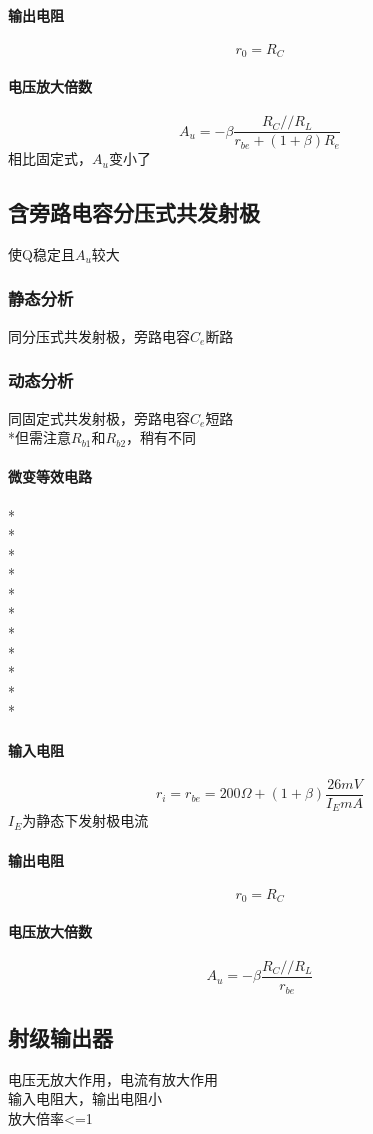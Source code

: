 \documentclass[UTF8, fontset=none]{ctexart}
\begin{document}
\begin{multicols*}{8}
\paragraph{输出电阻}
\[r_0 = R_{C}\]
\paragraph{电压放大倍数}
\[A_u = -\beta \frac{R_C//R_L}{r_{be} + (1 + \beta)R_e}\]
相比固定式，$A_u$变小了
\subsection{含旁路电容分压式共发射极}
使Q稳定且$A_u$较大
\subsubsection{静态分析}
同分压式共发射极，旁路电容$C_e$断路
\subsubsection{动态分析}
同固定式共发射极，旁路电容$C_e$短路\\
*但需注意$R_{b1}$和$R_{b2}$，稍有不同\\
\paragraph{微变等效电路}
*\\
*\\
*\\
*\\
*\\
*\\
*\\
*\\
*\\
*\\
*
\paragraph{输入电阻}
\[r_i = r_{be} = 200\Omega + (1 + \beta)\frac{26 mV}{I_E mA}\]
$I_E$为静态下发射极电流
\paragraph{输出电阻}
\[r_0 = R_{C}\]
\paragraph{电压放大倍数}
\[A_u = -\beta \frac{R_C//R_L}{r_{be}}\]
\subsection{射级输出器}
电压无放大作用，电流有放大作用\\
输入电阻大，输出电阻小\\
放大倍率<=1

\end{multicols*}
\end{document}
